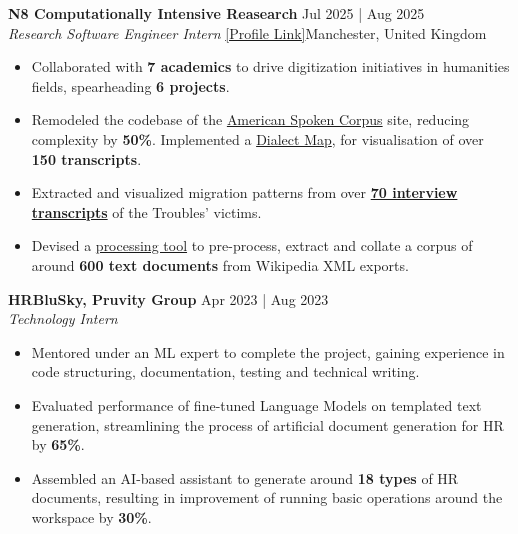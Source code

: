 \documentclass[a4paper]{extarticle}
\begin{document}
\textbf{N8 Computationally Intensive Reasearch} \hfill Jul 2025 | Aug 2025 \\
\textit{Research Software Engineer Intern}
\href{https://n8cir.org.uk/themes/internships/internships-2025/manchester/}{[Profile
Link]}\hfill Manchester, United Kingdom %
\begin{itemize}
  \item Collaborated with \textbf{7 academics} to drive digitization
    initiatives in humanities fields, spearheading \textbf{6 projects}.
  \item Remodeled the codebase of the
    \href{www.spokencorpus.org}{American Spoken Corpus} site,
    reducing complexity by \textbf{50\%}. Implemented a
    \href{https://spokencorpus.org/map_search.php}{Dialect Map}, for
    visualisation of over \textbf{150 transcripts}.
  \item Extracted and visualized migration patterns from over
    \href{https://conflictmemorymigration.manchester.ac.uk/interviews/}{\textbf{70
    interview transcripts}} of the Troubles' victims.
  \item Devised a
    \href{https://github.com/manojmanikandan7/WikipediaXmlParser}{processing
    tool} to pre-process, extract and collate a corpus of around
    \textbf{600 text documents} from Wikipedia XML exports.
\end{itemize}
\textbf{HRBluSky, Pruvity Group} \hfill Apr 2023 | Aug 2023
\\ %
\textit{Technology Intern}  %
\begin{itemize}
  \item Mentored under an ML expert to complete the project, gaining
    experience in code structuring, documentation, testing and
    technical writing.
  \item Evaluated performance of fine-tuned Language Models on
    templated text generation, streamlining the process of artificial
    document generation for HR by \textbf{65\%}.
  \item Assembled an AI-based assistant to generate around \textbf{18
    types} of HR documents, resulting in improvement of running basic
    operations around the workspace by \textbf{30\%}.
\end{itemize}

\end{document}
